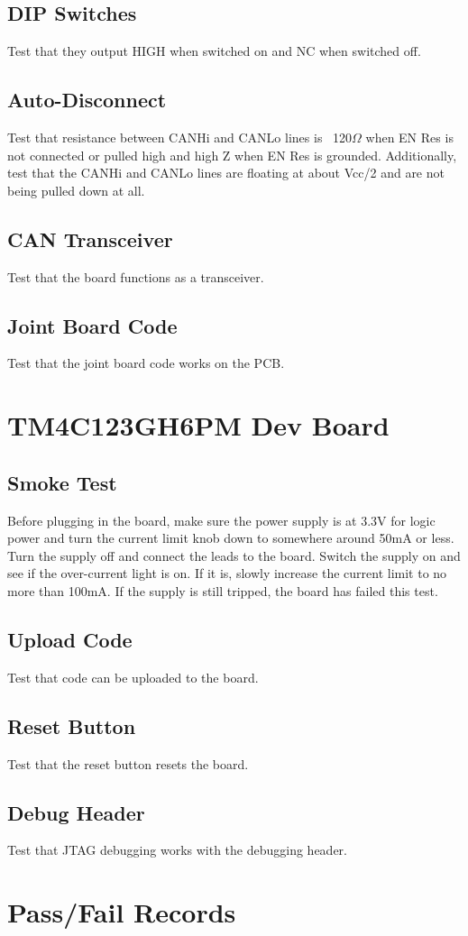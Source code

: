\documentclass[12pt,letterpaper]{article}
\begin{document}
	\subsection{DIP Switches}
	Test that they output HIGH when switched on and NC when switched off.
	
	\subsection{Auto-Disconnect}
	Test that resistance between CANHi and CANLo lines is ~120$\Omega$ when EN Res is not connected or pulled high and high Z when EN Res is grounded. Additionally, test that the CANHi and CANLo lines are floating at about Vcc/2 and are not being pulled down at all.
	
	\subsection{CAN Transceiver}
	Test that the board functions as a transceiver.
	
	\subsection{Joint Board Code}
	Test that the joint board code works on the PCB.
	
	\newpage
	\section{TM4C123GH6PM Dev Board}
	\subsection{Smoke Test}
	Before plugging in the board, make sure the power supply is at 3.3V for logic power and turn the current limit knob down to somewhere around 50mA or less. Turn the supply off and connect the leads to the board. Switch the supply on and see if the over-current light is on. If it is, slowly increase the current limit to no more than 100mA. If the supply is still tripped, the board has failed this test.
	
	\subsection{Upload Code}
	Test that code can be uploaded to the board.
	
	\subsection{Reset Button}
	Test that the reset button resets the board.
	
	\subsection{Debug Header}
	Test that JTAG debugging works with the debugging header.
	
	\section{Pass/Fail Records}
	
\end{document}
